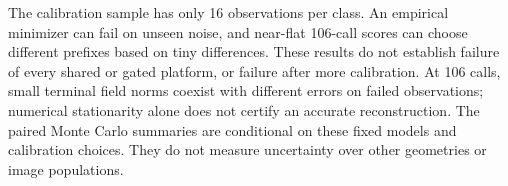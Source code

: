 The calibration sample has only 16 observations per class.
An empirical minimizer can fail on unseen noise, and near-flat
106-call scores can choose different prefixes based on tiny
differences. These results do not establish failure of every
shared or gated platform, or failure after more calibration.
At 106 calls, small terminal field norms coexist with different
errors on failed observations; numerical stationarity alone
does not certify an accurate reconstruction.
The paired Monte Carlo summaries are conditional on these fixed
models and calibration choices. They do not measure uncertainty
over other geometries or image populations.
